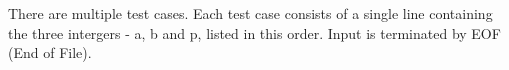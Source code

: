 There are multiple test cases. 
 Each test case consists of a single line containing the three intergers - a, b and p, listed in this order.
 Input is terminated by EOF (End of File).